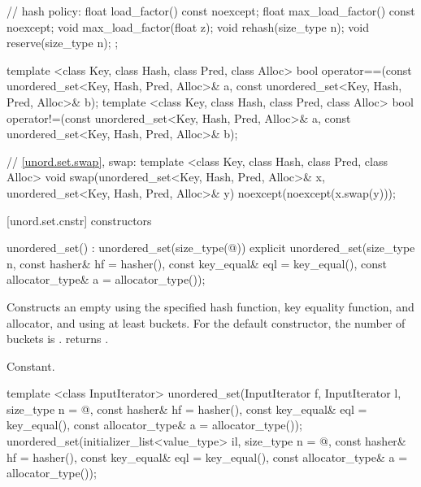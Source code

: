 \begin{codeblock}
{{    // hash policy:
    float load_factor() const noexcept;
    float max_load_factor() const noexcept;
    void max_load_factor(float z);
    void rehash(size_type n);
    void reserve(size_type n);
  };

  template <class Key, class Hash, class Pred, class Alloc>
    bool operator==(const unordered_set<Key, Hash, Pred, Alloc>& a,
                    const unordered_set<Key, Hash, Pred, Alloc>& b);
  template <class Key, class Hash, class Pred, class Alloc>
    bool operator!=(const unordered_set<Key, Hash, Pred, Alloc>& a,
                    const unordered_set<Key, Hash, Pred, Alloc>& b);

  // \ref{unord.set.swap}, swap:
  template <class Key, class Hash, class Pred, class Alloc>
    void swap(unordered_set<Key, Hash, Pred, Alloc>& x,
              unordered_set<Key, Hash, Pred, Alloc>& y)
      noexcept(noexcept(x.swap(y)));
}
\end{codeblock}

[unord.set.cnstr]{ constructors}

%
\begin{itemdecl}
unordered_set() : unordered_set(size_type(@\seebelow@)) { }
explicit unordered_set(size_type n,
                       const hasher& hf = hasher(),
                       const key_equal& eql = key_equal(),
                       const allocator_type& a = allocator_type());
\end{itemdecl}

\begin{itemdescr}
\pnum
\effects Constructs an empty  using the
specified hash function, key equality function, and allocator, and
using at least  buckets.  For the default constructor,
the number of buckets is .
 returns .

\pnum
\complexity Constant.
\end{itemdescr}

%
\begin{itemdecl}
template <class InputIterator>
  unordered_set(InputIterator f, InputIterator l,
                size_type n = @\seebelow@,
                const hasher& hf = hasher(),
                const key_equal& eql = key_equal(),
                const allocator_type& a = allocator_type());
unordered_set(initializer_list<value_type> il,
              size_type n = @\seebelow@,
              const hasher& hf = hasher(),
              const key_equal& eql = key_equal(),
              const allocator_type& a = allocator_type());
\end{itemdecl}

